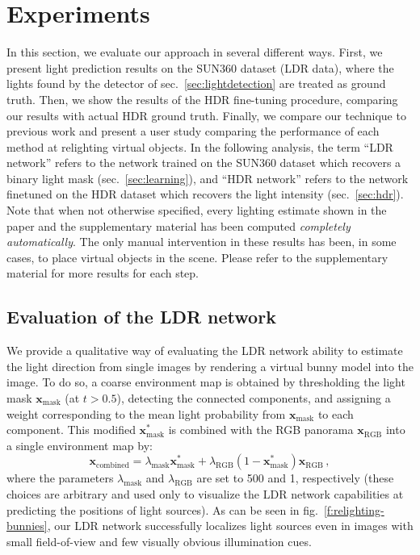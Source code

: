 \section{Experiments}
\label{sec:experiments}

In this section, we evaluate our approach in several different ways. First, we present light prediction results on the SUN360 dataset (LDR data), where the lights found by the detector of sec.~\ref{sec:lightdetection} are treated as ground truth. Then, we show the results of the HDR fine-tuning procedure, comparing our results with actual HDR ground truth. Finally, we compare our technique to previous work and present a user study comparing the performance of each method at relighting virtual objects. In the following analysis, the term ``LDR network'' refers to the network trained on the SUN360 dataset which recovers a binary light mask (sec.~\ref{sec:learning}), and ``HDR network'' refers to the network finetuned on the HDR dataset which recovers the light intensity (sec.~\ref{sec:hdr}). Note that when not otherwise specified, every lighting estimate shown in the paper and the supplementary material has been computed \emph{completely automatically}. The only manual intervention in these results has been, in some cases, to place virtual objects in the scene. Please refer to the supplementary material for more results for each step.


\subsection{Evaluation of the LDR network}

We provide a qualitative way of evaluating the LDR network ability to estimate the light direction from single images by rendering a virtual bunny model into the image. To do so, a coarse environment map is obtained by thresholding the light mask $\mathbf{x}_\text{mask}$ (at $t > 0.5$), detecting the connected components, and assigning a weight corresponding to the mean light probability from $\mathbf{x}_\text{mask}$ to each component. This modified $\mathbf{x}^*_\text{mask}$ is combined with the RGB panorama $\mathbf{x}_\text{RGB}$ into a single environment map by:
%
\begin{equation}
\mathbf{x}_\text{combined} = \lambda_\text{mask} \mathbf{x}^*_\text{mask} + \lambda_\text{RGB}(1-\mathbf{x}^*_\text{mask}) \mathbf{x}_\text{RGB} \,,
\label{e:ldr-envmap}
\end{equation}
%
where the parameters $\lambda_\text{mask}$ and $\lambda_\text{RGB}$ are set to 500 and 1, respectively (these choices are arbitrary and used only to visualize the LDR network capabilities at predicting the positions of light sources). As can be seen in fig.~\ref{f:relighting-bunnies}, our LDR network successfully localizes light sources even in images with small field-of-view and few visually obvious illumination cues. 


